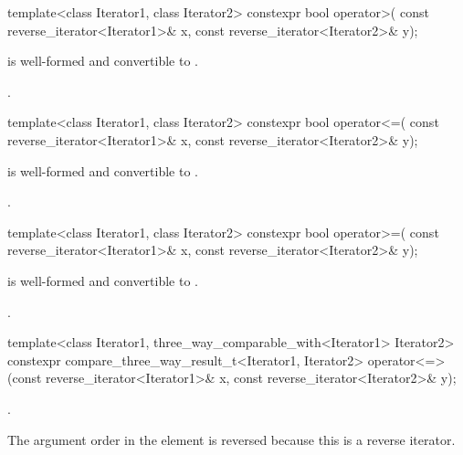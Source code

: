 %
\begin{itemdecl}
template<class Iterator1, class Iterator2>
  constexpr bool operator>(
    const reverse_iterator<Iterator1>& x,
    const reverse_iterator<Iterator2>& y);
\end{itemdecl}

\begin{itemdescr}
\pnum
\constraints
{} is well-formed and
convertible to .

\pnum
\returns
{}.
\end{itemdescr}

%
\begin{itemdecl}
template<class Iterator1, class Iterator2>
  constexpr bool operator<=(
    const reverse_iterator<Iterator1>& x,
    const reverse_iterator<Iterator2>& y);
\end{itemdecl}

\begin{itemdescr}
\pnum
\constraints
{} is well-formed and
convertible to .

\pnum
\returns
{}.
\end{itemdescr}

%
\begin{itemdecl}
template<class Iterator1, class Iterator2>
  constexpr bool operator>=(
    const reverse_iterator<Iterator1>& x,
    const reverse_iterator<Iterator2>& y);
\end{itemdecl}

\begin{itemdescr}
\pnum
\constraints
{} is well-formed and
convertible to .

\pnum
\returns
{}.
\end{itemdescr}

%
\begin{itemdecl}
template<class Iterator1, three_way_comparable_with<Iterator1> Iterator2>
  constexpr compare_three_way_result_t<Iterator1, Iterator2>
    operator<=>(const reverse_iterator<Iterator1>& x,
                const reverse_iterator<Iterator2>& y);
\end{itemdecl}

\begin{itemdescr}
\pnum
\returns
{}.

\pnum
\begin{note}
The argument order in the \returns element is reversed
because this is a reverse iterator.
\end{note}
\end{itemdescr}

